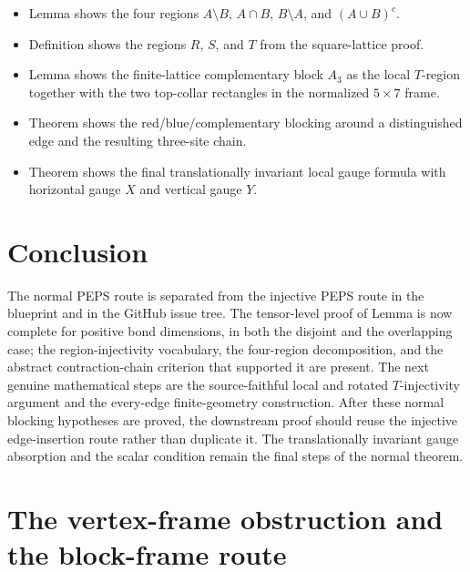 \documentclass{article}
\begin{document}
\begin{itemize}
    \item Lemma  shows the four regions
          $A\setminus B$, $A\cap B$, $B\setminus A$, and $(A\cup B)^c$.
    \item Definition  shows the regions
          $R$, $S$, and $T$ from the square-lattice proof.
    \item Lemma  shows the
          finite-lattice complementary block $A_3$ as the local $T$-region
          together with the two top-collar rectangles in the normalized
          $5\times7$ frame.
    \item Theorem  shows the
          red/blue/complementary blocking around a distinguished edge and the
          resulting three-site chain.
    \item Theorem  shows the final
          translationally invariant local gauge formula with horizontal gauge
          $X$ and vertical gauge $Y$.
\end{itemize}

\section{Conclusion}

The normal PEPS route is separated from the injective PEPS route in the
blueprint and in the GitHub issue tree. The tensor-level proof of Lemma
 is now complete for positive bond dimensions, in both the
disjoint and the overlapping case; the region-injectivity vocabulary, the
four-region decomposition, and the abstract contraction-chain criterion that
supported it are present. The next genuine mathematical steps are the
source-faithful local and rotated $T$-injectivity argument and the every-edge
finite-geometry construction. After these normal blocking hypotheses are proved,
the downstream proof should reuse the injective edge-insertion route rather than
duplicate it. The translationally invariant gauge absorption and the scalar
condition remain the final steps of the normal theorem.

\section{The vertex-frame obstruction and the block-frame route}
\end{document}
